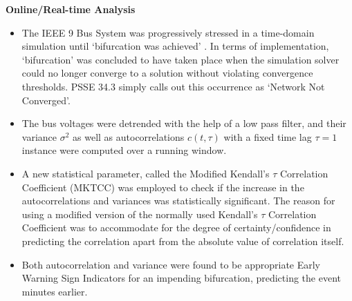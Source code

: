 \noindent\textbf{Online/Real-time Analysis}
\begin{itemize}
	\item The IEEE 9 Bus System was progressively stressed in a time-domain simulation until `bifurcation was achieved' \cite{sanchez01}. In terms of implementation, `bifurcation' was concluded to have taken place when the simulation solver could no longer converge to a solution without violating convergence thresholds. PSSE 34.3 simply calls out this occurrence as `Network Not Converged'.
	\item The bus voltages were detrended with the help of a low pass filter, and their variance $\sigma^2$ as well as autocorrelations $c(t, \tau)$ with a fixed time lag $\tau = 1$ instance were computed over a running window. 
	\item A new statistical parameter, called the Modified Kendall's $\tau$ Correlation Coefficient (MKTCC) was employed to check if the increase in the autocorrelations and variances was statistically significant. The reason for using a modified version of the normally used Kendall's $\tau$ Correlation Coefficient was to accommodate for the degree of certainty/confidence in predicting the correlation apart from the absolute value of correlation itself.
	\item Both autocorrelation and variance were found to be appropriate Early Warning Sign Indicators for an impending bifurcation, predicting the event minutes earlier. 
\end{itemize}